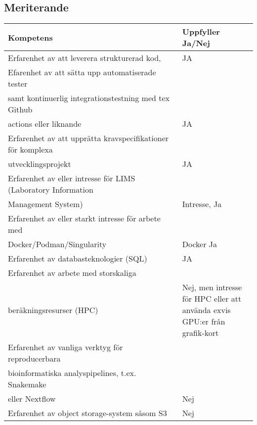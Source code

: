 \subsection{Meriterande} 
    \centering
    \begin{tabular}{p{0.7\linewidth} | p{0.3\linewidth} } 
        Kompetens & Uppfyller Ja/Nej
        \\ \hline
        Erfarenhet av att leverera strukturerad kod,    
        &
        JA
        \\ \hline
        Efarenhet av att sätta upp automatiserade tester \\
        samt kontinuerlig integrationstestning med tex Github \\
        actions eller liknande
        &
        JA
        \\ \hline
        Erfarenhet av att upprätta kravspecifikationer för komplexa\\ utvecklingsprojekt
        &
        JA
        \\ \hline
        Erfarenhet av eller intresse för LIMS (Laboratory Information \\ Management System)
        &
        Intresse, Ja
        \\ \hline
       Erfarenhet av eller starkt intresse för arbete med \\ Docker/Podman/Singularity
        &
        Docker Ja
        \\ \hline
        Erfarenhet av databasteknologier (SQL)
        &
        JA
        \\ \hline
        Erfarenhet av arbete med storskaliga  \\
        beräkningsresurser (HPC)
        &
        Nej, men intresse för HPC eller att använda
        exvis GPU:er från grafik-kort
        \\ \hline       
        Erfarenhet av vanliga verktyg för reproducerbara \\
        bioinformatiska analyspipelines, t.ex. Snakemake \\
        eller Nextflow
        &
        Nej
        \\ \hline
        Erfarenhet av object storage-system såsom S3
        &
        Nej
        \\ \hline
   \end{tabular}
    \caption{}
    \label{tab:my_label}
